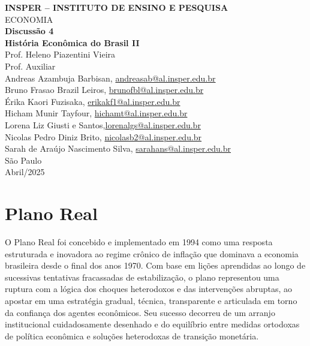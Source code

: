 \documentclass[a4paper,12pt]{article}[abntex2]
\begin{document}
\begin{titlepage}
    \centering
    \vspace*{1cm}
    \Large\textbf{INSPER – INSTITUTO DE ENSINO E PESQUISA}\\
    \Large ECONOMIA\\
    \vspace{1.5cm}
    \Large\textbf{Discussão 4}\\
    \textbf{História Econômica do Brasil II}\\
    \vspace{1.5cm}
    Prof. Heleno Piazentini Vieira \\
    Prof. Auxiliar  \\
    \vfill
    \normalsize
    Andreas Azambuja Barbisan, \href{mailto:andreasab@al.insper.edu.br}{andreasab@al.insper.edu.br}\\
    Bruno Frasao Brazil Leiros, \href{mailto:brunofbl@al.insper.edu.br}{brunofbl@al.insper.edu.br}\\
    Érika Kaori Fuzisaka, \href{mailto:erikakf1@al.insper.edu.br}{erikakf1@al.insper.edu.br}\\
    Hicham Munir Tayfour, \href{mailto:hichamt@al.insper.edu.br}{hichamt@al.insper.edu.br}\\
    Lorena Liz Giusti e Santos,\href{mailto:lorenalgs@al.insper.edu.br}{lorenalgs@al.insper.edu.br}\\
    Nicolas Pedro Diniz Brito, \href{mailto:nicolasb2@al.insper.edu.br}{nicolasb2@al.insper.edu.br}\\
    Sarah de Araújo Nascimento Silva, \href{mailto:sarahans@al.insper.edu.br}{sarahans@al.insper.edu.br}\\


    \vfill
    São Paulo\\
    Abril/2025
\end{titlepage}

\newpage
\tableofcontents
\thispagestyle{empty} %

\newpage
\setcounter{page}{1} %
\justify
\onehalfspacing

\section{\textbf{Plano Real}}

O Plano Real foi concebido e implementado em 1994 como uma resposta estruturada e inovadora ao regime crônico de inflação que dominava a economia brasileira desde o final dos anos 1970. Com base em lições aprendidas ao longo de sucessivas tentativas fracassadas de estabilização, o plano representou uma ruptura com a lógica dos choques heterodoxos e das intervenções abruptas, ao apostar em uma estratégia gradual, técnica, transparente e articulada em torno da confiança dos agentes econômicos. Seu sucesso decorreu de um arranjo institucional cuidadosamente desenhado e do equilíbrio entre medidas ortodoxas de política econômica e soluções heterodoxas de transição monetária.
\end{document}
